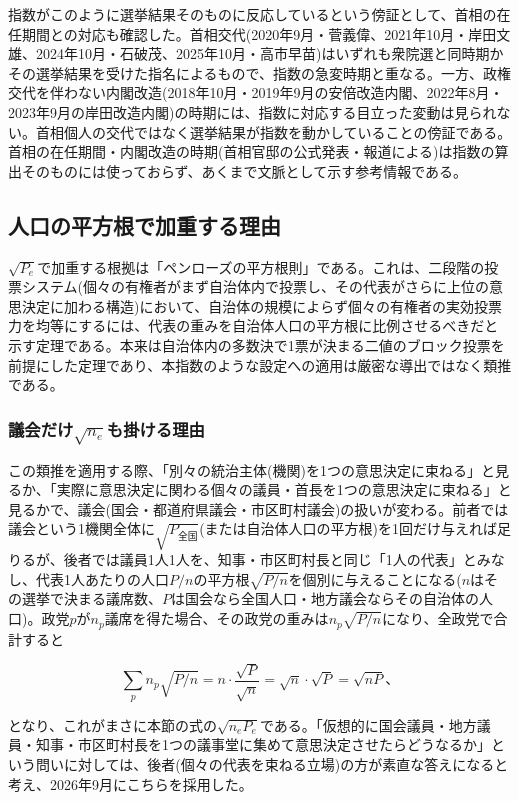 \documentclass[a4paper,11pt]{ltjsarticle}
\begin{document}
指数がこのように選挙結果そのものに反応しているという傍証として、首相の在任期間との対応も確認した。首相交代(2020年9月・菅義偉、2021年10月・岸田文雄、2024年10月・石破茂、2025年10月・高市早苗)はいずれも衆院選と同時期かその選挙結果を受けた指名によるもので、指数の急変時期と重なる。一方、政権交代を伴わない内閣改造(2018年10月・2019年9月の安倍改造内閣、2022年8月・2023年9月の岸田改造内閣)の時期には、指数に対応する目立った変動は見られない。首相個人の交代ではなく選挙結果が指数を動かしていることの傍証である。首相の在任期間・内閣改造の時期(首相官邸の公式発表・報道による)は指数の算出そのものには使っておらず、あくまで文脈として示す参考情報である。

\subsection{人口の平方根で加重する理由}

$\sqrt{P_e}$で加重する根拠は「ペンローズの平方根則」である。これは、二段階の投票システム(個々の有権者がまず自治体内で投票し、その代表がさらに上位の意思決定に加わる構造)において、自治体の規模によらず個々の有権者の実効投票力を均等にするには、代表の重みを自治体人口の平方根に比例させるべきだと示す定理である。本来は自治体内の多数決で1票が決まる二値のブロック投票を前提にした定理であり、本指数のような設定への適用は厳密な導出ではなく類推である。

\subsubsection{議会だけ$\sqrt{n_e}$も掛ける理由}

この類推を適用する際、「別々の統治主体(機関)を1つの意思決定に束ねる」と見るか、「実際に意思決定に関わる個々の議員・首長を1つの意思決定に束ねる」と見るかで、議会(国会・都道府県議会・市区町村議会)の扱いが変わる。前者では議会という1機関全体に$\sqrt{P_{\text{全国}}}$(または自治体人口の平方根)を1回だけ与えれば足りるが、後者では議員1人1人を、知事・市区町村長と同じ「1人の代表」とみなし、代表1人あたりの人口$P/n$の平方根$\sqrt{P/n}$を個別に与えることになる($n$はその選挙で決まる議席数、$P$は国会なら全国人口・地方議会ならその自治体の人口)。政党$p$が$n_p$議席を得た場合、その政党の重みは$n_p\sqrt{P/n}$になり、全政党で合計すると

\[
\sum_p n_p\sqrt{P/n} = n\cdot\frac{\sqrt{P}}{\sqrt{n}} = \sqrt{n}\cdot\sqrt{P} = \sqrt{n P}、
\]

となり、これがまさに本節の式の$\sqrt{n_eP_e}$である。「仮想的に国会議員・地方議員・知事・市区町村長を1つの議事堂に集めて意思決定させたらどうなるか」という問いに対しては、後者(個々の代表を束ねる立場)の方が素直な答えになると考え、2026年9月にこちらを採用した。
\end{document}
